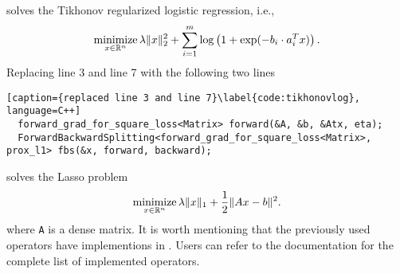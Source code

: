 solves the Tikhonov regularized logistic regression, i.e.,
$$\operatorname*{minimize}_{x \in \mathbb{R}^n} \lambda \|x\|_2^2 + \sum_{i = 1}^m \log\left(1 + \exp(-b_i \cdot a_i^T x)\right).$$
Replacing line 3 and line 7 with
the following two lines
\begin{lstlisting}[caption={replaced line 3 and line 7}\label{code:tikhonovlog}, language=C++]
  forward_grad_for_square_loss<Matrix> forward(&A, &b, &Atx, eta);
  ForwardBackwardSplitting<forward_grad_for_square_loss<Matrix>, prox_l1> fbs(&x, forward, backward);
\end{lstlisting}
solves the Lasso problem
$$\operatorname*{minimize}_{x \in \mathbb{R}^n} \lambda \|x\|_1 + \frac{1}{2}\|A x - b\|^2.$$
where \texttt{A} is a dense matrix. It is worth mentioning that the previously used operators have implementions in \pkg. Users can refer to the documentation for
the complete list of implemented operators.


